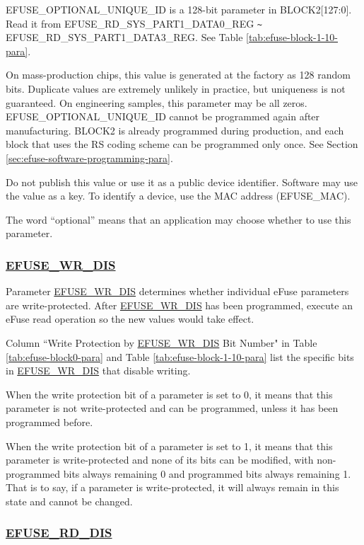 \documentclass[main\_\_EN.tex]{subfiles}
\begin{document}
EFUSE\_OPTIONAL\_UNIQUE\_ID is a 128-bit parameter in BLOCK2[127:0]. Read it from EFUSE\_RD\_SYS\_PART1\_DATA0\_REG \verb+~+ EFUSE\_RD\_SYS\_PART1\_DATA3\_REG. See Table \ref{tab:efuse-block-1-10-para}.

On mass-production chips, this value is generated at the factory as 128 random bits. Duplicate values are extremely unlikely in practice, but uniqueness is not guaranteed. On engineering samples, this parameter may be all zeros. EFUSE\_OPTIONAL\_UNIQUE\_ID cannot be programmed again after manufacturing. BLOCK2 is already programmed during production, and each block that uses the RS coding scheme can be programmed only once. See Section \ref{sec:efuse-software-programming-para}.

Do not publish this value or use it as a public device identifier. Software may use the value as a key. To identify a device, use the MAC address (EFUSE\_MAC).

The word ``optional'' means that an application may choose whether to use this parameter.

\subsubsection{\hyperref[fielddesc:EFUSEWRDIS]{EFUSE\_WR\_DIS}}
\label{sec:efuse-wr-dis}

Parameter \hyperref[fielddesc:EFUSEWRDIS]{EFUSE\_WR\_DIS} determines whether individual eFuse parameters are write-protected. After \hyperref[fielddesc:EFUSEWRDIS]{EFUSE\_WR\_DIS} has been programmed, execute an eFuse read operation so the new values would take effect.

Column ``Write Protection by \hyperref[fielddesc:EFUSEWRDIS]{EFUSE\_WR\_DIS} Bit Number" in Table  \ref{tab:efuse-block0-para} and Table \ref{tab:efuse-block-1-10-para} list the specific bits in \hyperref[fielddesc:EFUSEWRDIS]{EFUSE\_WR\_DIS} that disable writing.

When the write protection bit of a parameter is set to 0, it means that this parameter is not write-protected and can be programmed, unless it has been programmed before.

When the write protection bit of a parameter is set to 1, it means that this parameter is write-protected and none of its bits can be modified, with non-programmed bits always remaining 0 and programmed bits always remaining 1. That is to say, if a parameter is write-protected, it will always remain in this state and cannot be changed.

\subsubsection{\hyperref[fielddesc:EFUSERDDIS]{EFUSE\_RD\_DIS}}
\label{sec:efuse-rd-dis}
\end{document}
